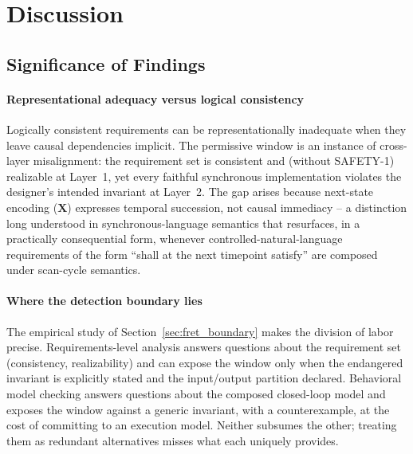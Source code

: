 \documentclass{ieeeaccess}
\theoremstyle{definition}
\newcommand{\X}{\mathbf{X}}
\begin{document}
\section{Discussion}
\label{sec:discussion}

\subsection{Significance of Findings}

\paragraph{Representational adequacy versus logical consistency}
Logically consistent requirements can be representationally inadequate when they leave causal dependencies implicit. The permissive window is an instance of cross-layer misalignment: the requirement set is consistent and (without SAFETY-1) realizable at Layer~1, yet every faithful synchronous implementation violates the designer's intended invariant at Layer~2. The gap arises because next-state encoding ($\X$) expresses temporal succession, not causal immediacy -- a distinction long understood in synchronous-language semantics \cite{Esterel} that resurfaces, in a practically consequential form, whenever controlled-natural-language requirements of the form ``shall at the next timepoint satisfy'' are composed under scan-cycle semantics.

\paragraph{Where the detection boundary lies}
The empirical study of Section~\ref{sec:fret_boundary} makes the division of labor precise. Requirements-level analysis answers questions about the requirement set (consistency, realizability) and can expose the window only when the endangered invariant is explicitly stated and the input/output partition declared. Behavioral model checking answers questions about the composed closed-loop model and exposes the window against a generic invariant, with a counterexample, at the cost of committing to an execution model. Neither subsumes the other; treating them as redundant alternatives misses what each uniquely provides.
\end{document}
